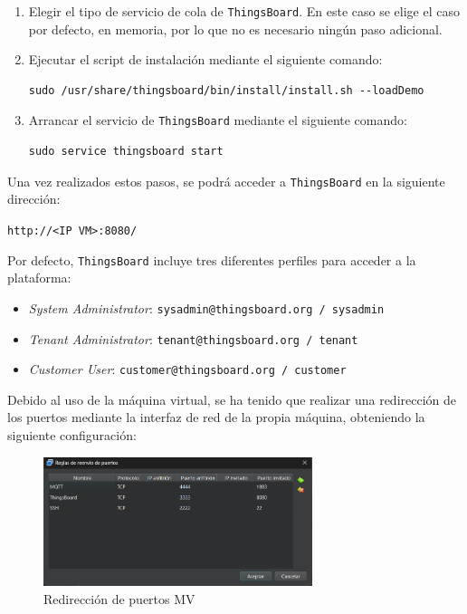 \begin{enumerate}
    \item Elegir el tipo de servicio de cola de \texttt{ThingsBoard}. En este caso se elige el caso por defecto, en memoria, por lo que no es necesario ningún paso adicional.

    \item Ejecutar el script de instalación mediante el siguiente comando:
    \begin{verbatim}
sudo /usr/share/thingsboard/bin/install/install.sh --loadDemo
    \end{verbatim}

    \item Arrancar el servicio de \texttt{ThingsBoard} mediante el siguiente comando:
    \begin{verbatim}
sudo service thingsboard start
    \end{verbatim}
\end{enumerate}

Una vez realizados estos pasos, se podrá acceder a \texttt{ThingsBoard} en la siguiente dirección: 

\texttt{http://<IP VM>:8080/}

Por defecto, \texttt{ThingsBoard} incluye tres diferentes perfiles para acceder a la plataforma:
\begin{itemize}
    \item \textit{System Administrator}: \texttt{sysadmin@thingsboard.org / sysadmin}
    \item \textit{Tenant Administrator}: \texttt{tenant@thingsboard.org / tenant}
    \item \textit{Customer User}: \texttt{customer@thingsboard.org / customer}
\end{itemize}

Debido al uso de la máquina virtual, se ha tenido que realizar una redirección de los puertos mediante la interfaz de red de la propia máquina, obteniendo la siguiente configuración:

\begin{figure}[H]
    \centering
    \includegraphics[width=0.7\textwidth]{images/3-software/3-2-2-thingsboard/PuertosMV.png}
    \caption{Redirección de puertos MV}
    \label{fig:3-2-2-PuertosMV}
\end{figure}

